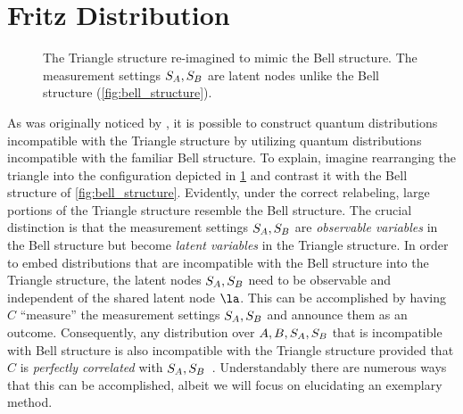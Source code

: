 \documentclass[aps, 10pt, english, twoside, pra, nofootinbib, tightenlines, longbibliography, superscriptaddress]{revtex4-1}
\begin{document}
    \section{Fritz Distribution}
    \label{sec:fritz_distribution}
    \begin{figure}
    \begin{center}
        \scalebox{1.0}{}
        \caption{The Triangle structure re-imagined to mimic the Bell structure. The measurement settings $S_{A},S_{B}$ are latent nodes unlike the Bell structure (\cref{fig:bell_structure}).}
        \label{fig:triangle_structure_with_fritz_bell_embedded}
    \end{center}
    \end{figure}

    As was originally noticed by \citet{Fritz_2012}, it is possible to construct quantum distributions incompatible with the Triangle structure by utilizing quantum distributions incompatible with the familiar Bell structure. To explain, imagine rearranging the triangle into the configuration depicted in \cref{fig:triangle_structure_with_fritz_bell_embedded} and contrast it with the Bell structure of \cref{fig:bell_structure}. Evidently, under the correct relabeling, large portions of the Triangle structure resemble the Bell structure. The crucial distinction is that the measurement settings $S_{A}, S_{B}$ are \textit{observable variables} in the Bell structure but become \textit{latent variables} in the Triangle structure. In order to embed distributions that are incompatible with the Bell structure into the Triangle structure, the latent nodes $S_{A}, S_{B}$ need to be observable and independent of the shared latent node $\la$. This can be accomplished by having $C$ ``measure'' the measurement settings $S_{A}, S_{B}$ and announce them as an outcome. Consequently, any distribution over $A, B, S_{A}, S_{B}$ that is incompatible with Bell structure is also incompatible with the Triangle structure provided that $C$ is \textit{perfectly correlated} with $S_{A}, S_{B}$~\cite{Fritz_2012}. Understandably there are numerous ways that this can be accomplished, albeit we will focus on elucidating an exemplary method.
\end{document}
